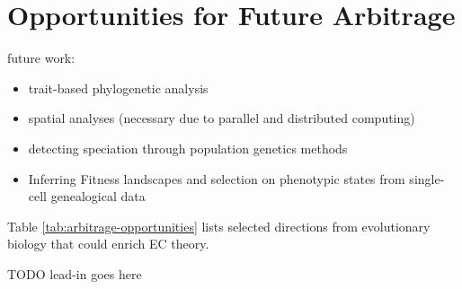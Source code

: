 \section{Opportunities for Future Arbitrage} \label{sec:opportunities}

future work:
\begin{itemize}
  \item trait-based phylogenetic analysis
  \item spatial analyses (necessary due to parallel and distributed computing)
  \item detecting speciation through population genetics methods \citep{sukumaran2021incorporating}
  \item Inferring Fitness landscapes and selection on phenotypic states from single-cell genealogical data \citep{nozoe2017inferring}
\end{itemize}

Table \ref{tab:arbitrage-opportunities} lists selected directions from evolutionary biology that could enrich EC theory.


TODO lead-in goes here


